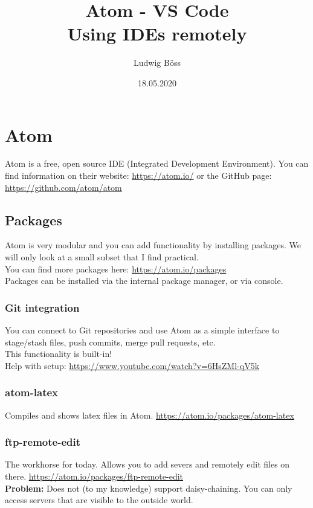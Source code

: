 \documentclass[10pt,a4paper]{article}
\title{Atom - VS Code\\Using IDEs remotely}
\date{18.05.2020}
\author{Ludwig Böss}
\begin{document}
\maketitle

\section{Atom}

Atom is a free, open source IDE (Integrated Development Environment). You can find information on their website: \url{https://atom.io/} or the GitHub page: \url{https://github.com/atom/atom}

\subsection{Packages}
Atom is very modular and you can add functionality by installing packages. We will only look at a small subset that I find practical.\\
You can find more packages here: \url{https://atom.io/packages}\\
Packages can be installed via the internal package manager, or via console.\\

\subsubsection{Git integration}
You can connect to Git repositories and use Atom as a simple interface to stage/stash files, push commits, merge pull requests, etc.\\
This functionality is built-in!\\
Help with setup: \url{https://www.youtube.com/watch?v=6HsZMl-qV5k}

\subsubsection{atom-latex}
Compiles and shows latex files in Atom. \url{https://atom.io/packages/atom-latex}

\subsubsection{ftp-remote-edit}
The workhorse for today. Allows you to add severs and remotely edit files on there.
\url{https://atom.io/packages/ftp-remote-edit}\\
\textbf{Problem:} Does not (to my knowledge) support daisy-chaining. You can only access servers that are visible to the outside world.
\end{document}
